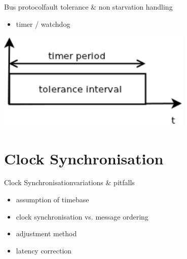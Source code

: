 \documentclass{beamer}
\begin{document}
\begin{frame}{Bus protocol}{fault tolerance \& non starvation handling}
\begin{center}
\begin{itemize}
 \item \begin{large}timer / watchdog\end{large}
\end{itemize}
\begin{center}
\includegraphics[width=0.7\textwidth]{./images/faulttolerance.png}
\end{center}
\end{center}
\end{frame}

\section{Clock Synchronisation}
\begin{frame}{Clock Synchronisation}{variations \& pitfalls}
\begin{center}
\begin{itemize}
  \item \begin{large}assumption of timebase\end{large}
 \item \begin{large}clock synchronisation vs. message ordering\end{large}
 \item \begin{large}adjustment method\end{large}
 \item \begin{large}latency correction\end{large}
\end{itemize}
\end{center}
\end{frame}
\end{document}
